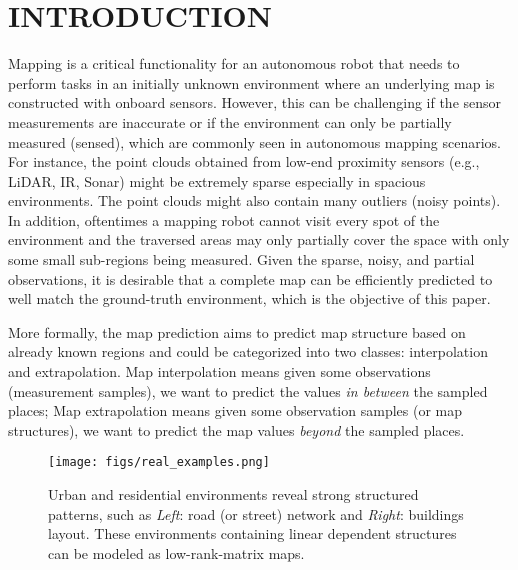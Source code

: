 \section{INTRODUCTION}
Mapping is a critical functionality for an autonomous robot that needs to perform tasks in an initially unknown environment where an underlying map is constructed with onboard sensors. 
However, this can be challenging if the sensor measurements are inaccurate or if the environment can only be partially measured (sensed), which are commonly seen in autonomous mapping scenarios. 
For instance, the point clouds obtained from low-end proximity sensors (e.g., LiDAR, IR, Sonar) might be extremely sparse especially in spacious environments. The point clouds might also contain many outliers (noisy points). In addition, oftentimes a mapping robot cannot visit every spot of the environment and the traversed areas may only partially cover the space with only some small sub-regions being measured. 
Given the sparse, noisy, and partial observations, it is desirable that a complete map can be efficiently predicted to well match the ground-truth environment, which is the objective of this paper. 

More formally, the map prediction aims to predict map structure based on already known regions and could be categorized into two classes: interpolation and extrapolation. Map interpolation means given some observations (measurement samples), we want to predict the values \textit{in between} the sampled places;
Map extrapolation means given some observation samples (or map structures), we want to predict the map values \textit{beyond} the sampled places. 

\begin{figure} \vspace{5pt}
  \centering
  	{\label{fig:real}\texttt{[image: figs/real\_examples.png]}}
  \caption{\small Urban and residential environments reveal strong structured patterns, such as \textit{Left}: road (or street) network and \textit{Right}: buildings layout. These environments containing linear dependent structures can be modeled as low-rank-matrix maps.} 
\label{fig:real}  
\end{figure}


